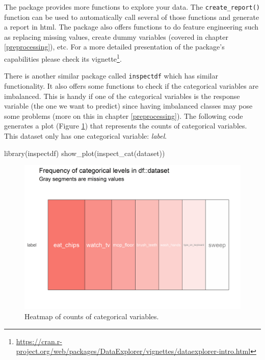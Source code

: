 \documentclass[
  11pt,
]{krantz}
\newenvironment{Shaded}{\begin{snugshade}}{\end{snugshade}}
\newcommand{\FunctionTok}[1]{\textcolor[rgb]{0,0,0}{#1}}
\newcommand{\NormalTok}[1]{#1}
\begin{document}
The package provides more functions to explore your data. The \texttt{create\_report()} function can be used to automatically call several of those functions and generate a report in html. The package also offers functions to do feature engineering such as replacing missing values, create dummy variables (covered in chapter \ref{preprocessing}), etc. For a more detailed presentation of the package's capabilities please check its vignette\footnote{\url{https://cran.r-project.org/web/packages/DataExplorer/vignettes/dataexplorer-intro.html}}.

There is another similar package called \texttt{inspectdf} \citep{inspectdf} which has similar functionality. It also offers some functions to check if the categorical variables are imbalanced. This is handy if one of the categorical variables is the response variable (the one we want to predict) since having imbalanced classes may pose some problems (more on this in chapter \ref{preprocessing}). The following code generates a plot (Figure \ref{fig:heatHomeTasks}) that represents the counts of categorical variables. This dataset only has one categorical variable: \emph{label}.

\begin{Shaded}
\begin{Highlighting}[]
\FunctionTok{library}\NormalTok{(inspectdf)}
\FunctionTok{show\_plot}\NormalTok{(}\FunctionTok{inspect\_cat}\NormalTok{(dataset))}
\end{Highlighting}
\end{Shaded}

\begin{figure}

{\centering \includegraphics[width=1\linewidth]{images/heatmapHomeTasks} 

}

\caption{Heatmap of counts of categorical variables.}\label{fig:heatHomeTasks}
\end{figure}
\end{document}
